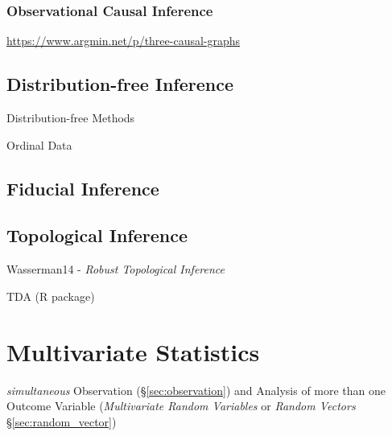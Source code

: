 \subsubsection{Observational Causal Inference}
\label{sec:observational_causal_inference}

\url{https://www.argmin.net/p/three-causal-graphs}



\subsection{Distribution-free Inference}\label{sec:distribution_free}

Distribution-free Methods

Ordinal Data



\subsection{Fiducial Inference}\label{sec:fiducial_inference}

\subsection{Topological Inference}\label{sec:topological_inference}

Wasserman14 - \emph{Robust Topological Inference}

TDA (R package)



\section{Multivariate Statistics}\label{sec:multivariate_statistics}

\emph{simultaneous} Observation (\S\ref{sec:observation}) and Analysis of more
than one Outcome Variable (\emph{Multivariate Random Variables} or \emph{Random
  Vectors} \S\ref{sec:random_vector})

